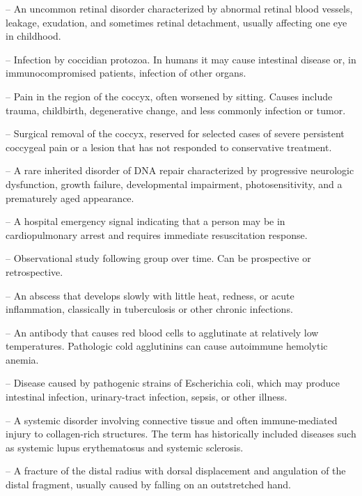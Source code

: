 -- An uncommon retinal disorder characterized by abnormal retinal blood vessels, leakage, exudation, and sometimes retinal detachment, usually affecting one eye in childhood.

-- Infection by coccidian protozoa. In humans it may cause intestinal disease or, in immunocompromised patients, infection of other organs.

-- Pain in the region of the coccyx, often worsened by sitting. Causes include trauma, childbirth, degenerative change, and less commonly infection or tumor.

-- Surgical removal of the coccyx, reserved for selected cases of severe persistent coccygeal pain or a lesion that has not responded to conservative treatment.

-- A rare inherited disorder of DNA repair characterized by progressive neurologic dysfunction, growth failure, developmental impairment, photosensitivity, and a prematurely aged appearance.

-- A hospital emergency signal indicating that a person may be in cardiopulmonary arrest and requires immediate resuscitation response.

-- Observational study following group over time. Can be prospective or retrospective.

-- An abscess that develops slowly with little heat, redness, or acute inflammation, classically in tuberculosis or other chronic infections.

-- An antibody that causes red blood cells to agglutinate at relatively low temperatures. Pathologic cold agglutinins can cause autoimmune hemolytic anemia.

-- Disease caused by pathogenic strains of Escherichia coli, which may produce intestinal infection, urinary-tract infection, sepsis, or other illness.

-- A systemic disorder involving connective tissue and often immune-mediated injury to collagen-rich structures. The term has historically included diseases such as systemic lupus erythematosus and systemic sclerosis.

-- A fracture of the distal radius with dorsal displacement and angulation of the distal fragment, usually caused by falling on an outstretched hand.

